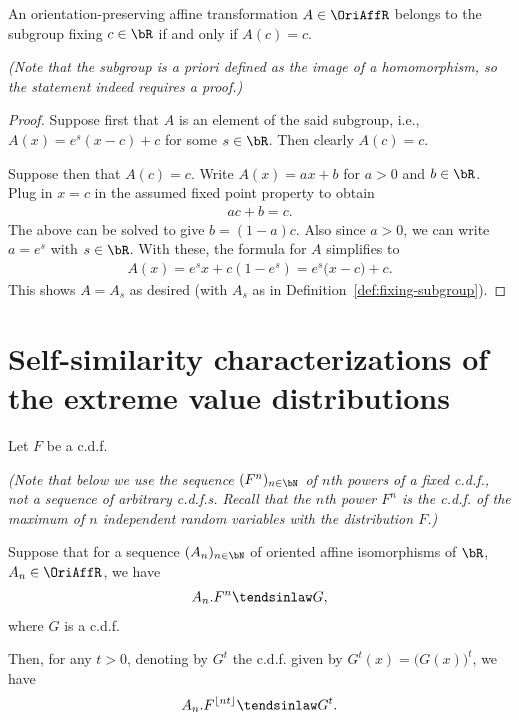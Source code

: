 \begin{lemma}
  \label{lem:fixing-subgroup-characterization}
  \leanok
  An orientation-preserving affine transformation $A \in \OriAffR$
  belongs to the subgroup fixing $c \in \bR$ if and only if $A(c) = c$.

  \emph{(Note that the subgroup is a priori defined as the image of a homomorphism,
  so the statement indeed requires a proof.)}
\end{lemma}
\begin{proof}
  Suppose first that $A$ is an element of the said subgroup, i.e.,
  $A(x) = e^{s} (x - c) + c$ for some $s \in \bR$. Then clearly $A(c) = c$.

  Suppose then that $A(c) = c$. Write $A(x) = a x + b$ for $a>0$ and $b \in \bR$.
  Plug in $x=c$ in the assumed fixed point property to obtain
  \begin{align*}
    a c + b = c .
  \end{align*}
  The above can be solved to give $b = (1-a)c$.
  Also since $a>0$, we can write $a = e^s$ with $s \in \bR$.
  With these, the formula for $A$ simplifies to
  \begin{align*}
    A(x) = e^s x + c (1 - e^s) = e^s \big( x - c \big) + c .
  \end{align*}
  This shows $A = A_s$ as desired (with $A_s$ as in Definition~\ref{def:fixing-subgroup}).
\end{proof}


\section{Self-similarity characterizations of the extreme value distributions}

\begin{lemma}
  \label{lem:continuous-parameter-ev-limit}
  Let $F$ be a c.d.f.

  \emph{(Note that below we use
  the sequence $(F^n)_{n \in \bN}$ of $n$th powers of a fixed c.d.f.,
  not a sequence of arbitrary c.d.f.s.
  Recall that the $n$th power $F^n$ is the c.d.f. of the maximum
  of $n$ independent random variables with the distribution $F$.)}

  Suppose that for a sequence $(A_n)_{n \in \bN}$ of oriented
  affine isomorphisms of $\bR$, $A_n \in \OriAffR$, we have
  \begin{align*}
    A_n.F^n \tendsinlaw G ,
  \end{align*}
  where $G$ is a c.d.f.

  Then, for any $t > 0$, denoting by $G^t$ the c.d.f. given by
  $G^t(x) = \big( G(x) \big)^t$, we have
  \begin{align*}
    A_{n}.F^{\lfloor n t \rfloor} \tendsinlaw G^t .
  \end{align*}
\end{lemma}

